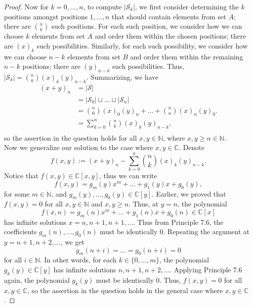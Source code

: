 \documentclass{article}
\begin{document}
\begin{enumerate}[label={\bf Q\arabic*:}]
\begin{proof}
      Now for $k=0,\ldots,n$, to compute $|\mathcal{S}_k|$, we first
      consider determining the $k$ positions amongst positions $1,\ldots,n$
      that should contain elements from set $A$; there are $\binom{n}{k}$
      such positions. For each such position, we consider how we can choose
      $k$ elements from set $A$ and order them within the chosen positions;
      there are $(x)_k$ such possibilities. Similarly, for each such
      possibility, we consider how we can choose $n-k$ elements from set
      $B$ and order them within the remaining $n-k$ positions; there are
      $(y)_{n-k}$ such possibilities. Thus,
      $|\mathcal{S}_k|=\binom{n}{k}(x)_k(y)_{n-k}$. Summarizing, we have
      \begin{align*}
        (x+y)_n &=|\mathcal{S}| \\
        &=|\mathcal{S}_0|\sqcup\ldots\sqcup|\mathcal{S}_n| \\
        &=\binom{n}{0}(x)_0(y)_n +\ldots +\binom{n}{n}(x)_n(y)_0. \\
        &=\sum_{k=0}^n\binom{n}{k}(x)_k(y)_{n-k}, \\
      \end{align*}
      so the assertion in the question holds for all $x,y\in\mathbb{N}$,
      where $x,y\geq n\in\mathbb{N}$. \\

      Now we generalize our solution to the case where $x,y\in\mathbb{C}$.
      Denote \[f(x,y):=(x+y)_n-\sum_{k=0}^n\binom{n}{k}(x)_k(y)_{n-k}.\]
      Notice that $f(x,y)\in\mathbb{C}[x,y]$, thus we can write
      \[f(x,y)= g_m(y)x^m+\ldots+g_1(y)x+g_0(y),\]
      for some $m\in\mathbb{N}$, and
      $g_m(y),\ldots,g_0(y)\in\mathbb{C}[y]$. Earlier, we proved that
      $f(x,y)=0$ for all $x,y\in\mathbb{N}$ and $x,y\geq n$. Thus, at
      $y=n$, the polynomial
      \[f(x,n)= g_m(n)x^m+\ldots+g_1(n)x+g_0(n) \in\mathbb{C}[x]\]
      has infinite solutions $x=n,n+1,n+1,\ldots$. Thus from Principle 7.6,
      the coefficients $g_m(n),\ldots,g_0(n)$ must be identically 0.
      Repeating the argument at $y=n+1,n+2,\ldots$, we get
      \[g_m(n+i)=\ldots=g_0(n+i)=0\]
      for all $i\in\mathbb{N}$. In other words, for each
      $k\in\{0,\ldots,m\}$, the polynomial $g_k(y)\in\mathbb{C}[y]$ has
      infinite solutions $n,n+1,n+2,\ldots$. Applying Principle 7.6 again,
      the polynomial $g_k(y)$ must be identically 0. Thus, $f(x,y)=0$ for
      all $x,y\in\mathbb{C}$, so the assertion in the question holds in
      the general case where $x,y\in\mathbb{C}$.
    \end{proof}


\end{enumerate}
\end{document}
